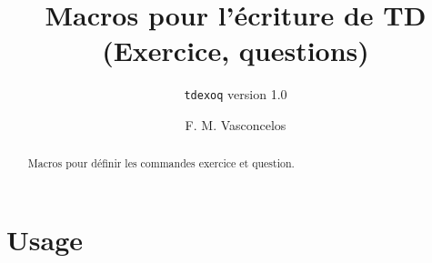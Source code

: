 \documentclass[a4paper,9pt]{article}
\title{Macros pour l'écriture de TD (Exercice, questions)}
\subtitle{\texttt{tdexoq} version 1.0}
\author{F. M. Vasconcelos}
\date{}
\begin{document}
\maketitle
\begin{abstract}
    Macros pour définir les commandes exercice et question.
\end{abstract}

\section{Usage}
\exercice{}
\question
\question
\question
{}
\question
\question
\question
\end{document}
